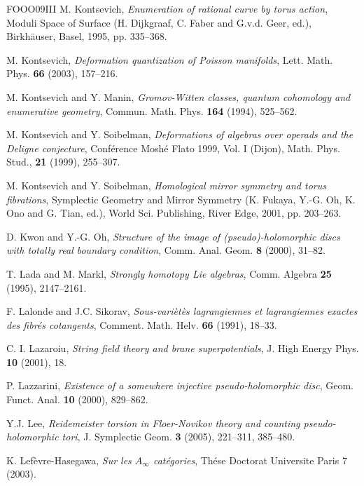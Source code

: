 \begin{thebibliography}{FOOO09III}
 M. Kontsevich, \emph{Enumeration of rational curve by torus action}, Moduli Space of Surface (H. Dijkgraaf, C. Faber and G.v.d. Geer, ed.), Birkhäuser, Basel, 1995, pp. 335–368.

 M. Kontsevich, \emph{Deformation quantization of Poisson manifolds}, Lett. Math. Phys. \textbf{66} (2003), 157–216.

 M. Kontsevich and Y. Manin, \emph{Gromov-Witten classes, quantum cohomology and enumerative geometry}, Commun. Math. Phys. \textbf{164} (1994), 525–562.

 M. Kontsevich and Y. Soibelman, \emph{Deformations of algebras over operads and the Deligne conjecture}, Conférence Moshé Flato 1999, Vol. I (Dijon), Math. Phys. Stud., \textbf{21} (1999), 255–307.

 M. Kontsevich and Y. Soibelman, \emph{Homological mirror symmetry and torus fibrations}, Symplectic Geometry and Mirror Symmetry (K. Fukaya, Y.-G. Oh, K. Ono and G. Tian, ed.), World Sci. Publishing, River Edge, 2001, pp. 203–263.

 D. Kwon and Y.-G. Oh, \emph{Structure of the image of (pseudo)-holomorphic discs with totally real boundary condition}, Comm. Anal. Geom. \textbf{8} (2000), 31–82.

 T. Lada and M. Markl, \emph{Strongly homotopy Lie algebras}, Comm. Algebra \textbf{25} (1995), 2147–2161.

 F. Lalonde and J.C. Sikorav, \emph{Sous-variètès lagrangiennes et lagrangiennes exactes des fibrés cotangents}, Comment. Math. Helv. \textbf{66} (1991), 18–33.

 C. I. Lazaroiu, \emph{String field theory and brane superpotentials}, J. High Energy Phys. \textbf{10} (2001), 18.

 P. Lazzarini, \emph{Existence of a somewhere injective pseudo-holomorphic disc}, Geom. Funct. Anal. \textbf{10} (2000), 829–862.

 Y.J. Lee, \emph{Reidemeister torsion in Floer-Novikov theory and counting pseudo-holomorphic tori}, J. Symplectic Geom. \textbf{3} (2005), 221–311, 385–480.

 K. Lefèvre-Hasegawa, \emph{Sur les \(A_\infty\) catégories}, Thése Doctorat Universite Paris 7 (2003).


\end{thebibliography}
